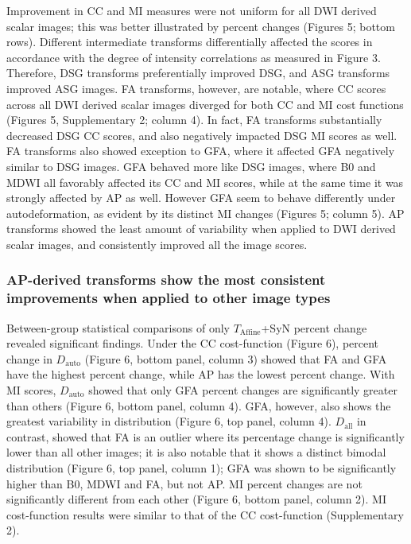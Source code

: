 Improvement in CC and MI measures were not uniform for all DWI derived scalar images; this was better illustrated by percent changes (Figures 5; bottom rows). Different intermediate transforms differentially affected the scores in accordance with the degree of intensity correlations as measured in Figure 3. Therefore, DSG transforms preferentially improved DSG, and ASG transforms improved ASG images. FA transforms, however, are notable, where CC scores across all DWI derived scalar images diverged for both CC and MI cost functions (Figures 5, Supplementary 2; column 4). In fact, FA transforms substantially decreased DSG CC scores, and also negatively impacted DSG MI scores as well. FA transforms also showed exception to GFA, where it affected GFA negatively similar to DSG images. GFA behaved more like DSG images, where B0 and MDWI all favorably affected its CC and MI scores, while at the same time it was strongly affected by AP as well. However GFA seem to behave differently under autodeformation, as evident by its distinct MI changes (Figures 5; column 5). AP transforms showed the least amount of variability when applied to DWI derived scalar images, and consistently improved all the image scores. 

\subsubsection{AP-derived transforms show the most consistent improvements when applied to other image types}

Between-group statistical comparisons of only $T_{\text{Affine}}$+SyN percent change revealed significant findings. Under the CC cost-function (Figure 6), percent change in $D_{\text{auto}}$ (Figure 6, bottom panel, column 3) showed that FA and GFA have the highest percent change, while AP has the lowest percent change. With MI scores, $D_{\text{auto}}$ showed that only GFA percent changes are significantly greater than others (Figure 6, bottom panel, column 4). GFA, however, also shows the greatest variability in distribution (Figure 6, top panel, column 4).  $D_{\text{all}}$ in contrast, showed that FA is an outlier where its percentage change is significantly lower than all other images; it is also notable that it shows a distinct bimodal distribution (Figure 6, top panel, column 1); GFA was shown to be significantly higher than B0, MDWI and FA, but not AP. MI percent changes are not significantly different from each other (Figure 6, bottom panel, column 2). MI cost-function results were similar to that of the CC cost-function (Supplementary 2). 

